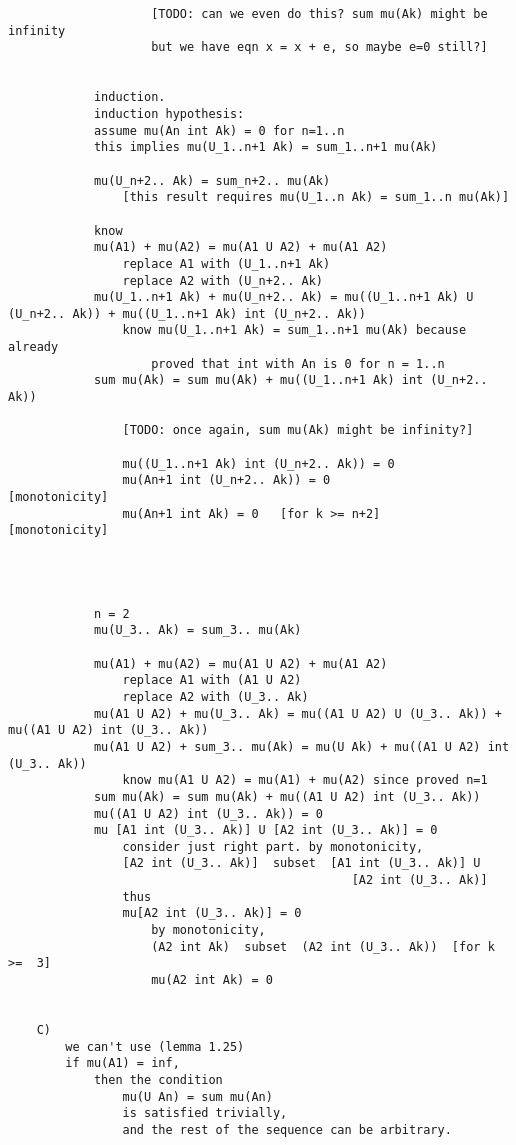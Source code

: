 \documentclass{article}
\begin{document}
\begin{flushleft}
\begin{verbatim}
                    [TODO: can we even do this? sum mu(Ak) might be infinity
                    but we have eqn x = x + e, so maybe e=0 still?]


            induction.
            induction hypothesis:
            assume mu(An int Ak) = 0 for n=1..n
            this implies mu(U_1..n+1 Ak) = sum_1..n+1 mu(Ak)

            mu(U_n+2.. Ak) = sum_n+2.. mu(Ak)
                [this result requires mu(U_1..n Ak) = sum_1..n mu(Ak)]

            know 
            mu(A1) + mu(A2) = mu(A1 U A2) + mu(A1 A2)
                replace A1 with (U_1..n+1 Ak)
                replace A2 with (U_n+2.. Ak)
            mu(U_1..n+1 Ak) + mu(U_n+2.. Ak) = mu((U_1..n+1 Ak) U (U_n+2.. Ak)) + mu((U_1..n+1 Ak) int (U_n+2.. Ak))
                know mu(U_1..n+1 Ak) = sum_1..n+1 mu(Ak) because already 
                    proved that int with An is 0 for n = 1..n 
            sum mu(Ak) = sum mu(Ak) + mu((U_1..n+1 Ak) int (U_n+2.. Ak))

                [TODO: once again, sum mu(Ak) might be infinity?]

                mu((U_1..n+1 Ak) int (U_n+2.. Ak)) = 0 
                mu(An+1 int (U_n+2.. Ak)) = 0            [monotonicity]
                mu(An+1 int Ak) = 0   [for k >= n+2]     [monotonicity]




            n = 2
            mu(U_3.. Ak) = sum_3.. mu(Ak)

            mu(A1) + mu(A2) = mu(A1 U A2) + mu(A1 A2)
                replace A1 with (A1 U A2)
                replace A2 with (U_3.. Ak) 
            mu(A1 U A2) + mu(U_3.. Ak) = mu((A1 U A2) U (U_3.. Ak)) + mu((A1 U A2) int (U_3.. Ak))
            mu(A1 U A2) + sum_3.. mu(Ak) = mu(U Ak) + mu((A1 U A2) int (U_3.. Ak))
                know mu(A1 U A2) = mu(A1) + mu(A2) since proved n=1
            sum mu(Ak) = sum mu(Ak) + mu((A1 U A2) int (U_3.. Ak))
            mu((A1 U A2) int (U_3.. Ak)) = 0 
            mu [A1 int (U_3.. Ak)] U [A2 int (U_3.. Ak)] = 0
                consider just right part. by monotonicity, 
                [A2 int (U_3.. Ak)]  subset  [A1 int (U_3.. Ak)] U 
                                                [A2 int (U_3.. Ak)]
                thus 
                mu[A2 int (U_3.. Ak)] = 0 
                    by monotonicity, 
                    (A2 int Ak)  subset  (A2 int (U_3.. Ak))  [for k >=  3]
                    mu(A2 int Ak) = 0 


    C)
        we can't use (lemma 1.25)
        if mu(A1) = inf, 
            then the condition 
                mu(U An) = sum mu(An) 
                is satisfied trivially, 
                and the rest of the sequence can be arbitrary.


\end{verbatim}
\end{flushleft}
\end{document}

